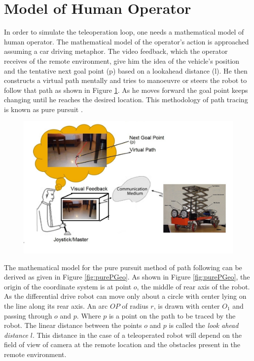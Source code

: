 \section{Model of Human Operator}
In order to simulate the teleoperation loop, one needs a mathematical model of human operator. The mathematical  model of the operator's action is approached assuming a car driving metaphor.
 The video feedback, which the operator receives of the remote environment, give him the idea of the vehicle's  position and the tentative next goal point (p) based on a lookahead distance (l). He then constructs a  virtual path mentally and tries to manoeuvre or steers the robot to follow that path as shown in Figure \ref{fig:drivingStratagy}. As he moves forward the goal point keeps changing until he reaches the desired location. This methodology of path tracing is known as pure pursuit \cite{coulter1992implementation}. 
\begin{figure}
	\includegraphics[width=\linewidth,keepaspectratio]{Chapter6/fig/mentalMap}
	\label{fig:drivingStratagy} 
\end{figure}

The mathematical model for the pure pursuit method of path following can be derived as given in Figure \ref{fig:purePGeo}.
As shown in Figure \ref{fig:purePGeo}, the origin of the coordinate system is at point $o$, the middle of rear axis of the robot. As the differential drive robot  can move only about a circle with center  lying on the line along its rear axis. An arc $OP$ of radius $r$, is drawn with center $O_1$ and passing through $o$ and $p$. Where $p$ is a point on the path to be traced by the robot. The linear distance  between the points $o$ and  $p$ is called the\textit{ look ahead distance} $l$. This distance in the case of a teleoperated robot will depend on the field of view of camera at the remote location and the obstacles present in the remote environment.

